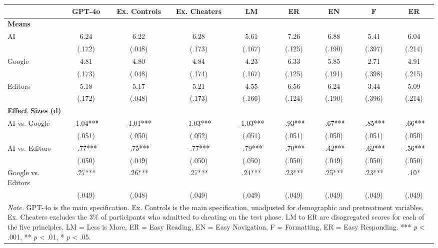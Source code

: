 \documentclass[11pt]{report}
\begin{document}
\begin{append}
\begin{table}
\begin{tabular}{lcccccccc}
\toprule
  & GPT-4o & Ex. Controls & Ex. Cheaters & LM & ER & EN & F & ER \\ 
\midrule
\multicolumn{9}{l}{\textbf{Means}} \\[2.5pt] 
\midrule
{AI} & {6.24} & {6.22} & {6.28} & {5.61} & {7.26} & {6.88} & {5.41} & {6.04} \\ 
{} & {(.172)} & {(.048)} & {(.173)} & {(.167)} & {(.125)} & {(.190)} & {(.397)} & {(.214)} \\ 
{Google} & {4.81} & {4.80} & {4.84} & {4.23} & {6.33} & {5.85} & {2.71} & {4.91} \\ 
{} & {(.173)} & {(.048)} & {(.174)} & {(.167)} & {(.125)} & {(.191)} & {(.398)} & {(.215)} \\ 
{Editors} & {5.18} & {5.17} & {5.21} & {4.55} & {6.56} & {6.24} & {3.44} & {5.09} \\ 
{} & {(.172)} & {(.048)} & {(.173)} & {(.166)} & {(.124)} & {(.190)} & {(.396)} & {(.214)} \\ 
\midrule
\multicolumn{9}{l}{\textbf{Effect Sizes (d)}} \\[2.5pt] 
\midrule
{AI vs. Google} & {-1.04***} & {-1.01***} & {-1.03***} & {-1.03***} & {-.93***} & {-.67***} & {-.85***} & {-.66***} \\ 
{} & {(.051)} & {(.050)} & {(.052)} & {(.051)} & {(.051)} & {(.050)} & {(.051)} & {(.050)} \\ 
{AI vs. Editors} & {-.77***} & {-.75***} & {-.77***} & {-.79***} & {-.70***} & {-.42***} & {-.62***} & {-.56***} \\ 
{} & {(.050)} & {(.049)} & {(.050)} & {(.050)} & {(.050)} & {(.049)} & {(.050)} & {(.050)} \\ 
{Google vs. Editors} & {.27***} & {.26***} & {.27***} & {.24***} & {.23***} & {.25***} & {.23***} & {.10*} \\ 
{} & {(.049)} & {(.048)} & {(.049)} & {(.049)} & {(.049)} & {(.049)} & {(.049)} & {(.049)} \\ 
\midrule
\multicolumn{9}{p{14cm}}{\textit{Note.} GPT-4o is the main specification. Ex. Controls is the main specification, unadjusted for demographic and pretreatment variables, Ex. Cheaters excludes the 3\% of participants who admitted to cheating on the test phase.  LM to ER are disagregated scores for each of the five principles. LM = Less is More, ER = Easy Reading, EN = Easy Navigation, F = Formatting, ER = Easy Responding.  *** \textit{p} < .001, ** \textit{p} < .01, * \textit{p} < .05.}
\end{tabular}
\label{tab:practice_effects_s5}
\end{table}


\end{append}
\end{document}

